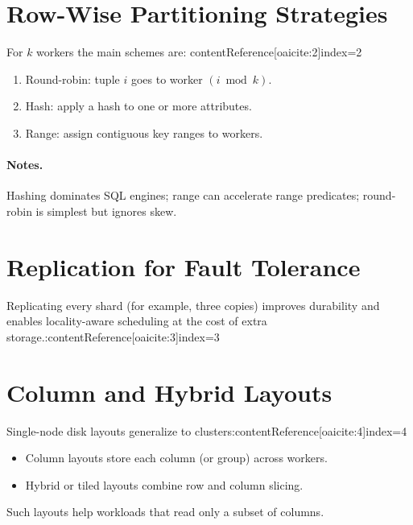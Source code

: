\documentclass[11pt]{article}
\begin{document}
\section{Row-Wise Partitioning Strategies}

For \(k\) workers the main schemes are: contentReference[oaicite:2]{index=2}
\begin{enumerate}[itemsep=0pt]
  \item Round-robin: tuple \(i\) goes to worker \((i \bmod k)\).
  \item Hash: apply a hash to one or more attributes.
  \item Range: assign contiguous key ranges to workers.
\end{enumerate}

\paragraph{Notes.}
Hashing dominates SQL engines; range can accelerate range predicates; round-robin is simplest but ignores skew.

\section{Replication for Fault Tolerance}

Replicating every shard (for example, three copies) improves durability and enables locality-aware scheduling at the cost of extra storage.:contentReference[oaicite:3]{index=3}

\section{Column and Hybrid Layouts}

Single-node disk layouts generalize to clusters:contentReference[oaicite:4]{index=4}
\begin{itemize}[itemsep=0pt]
  \item Column layouts store each column (or group) across workers.
  \item Hybrid or tiled layouts combine row and column slicing.
\end{itemize}
Such layouts help workloads that read only a subset of columns.

\end{document}
